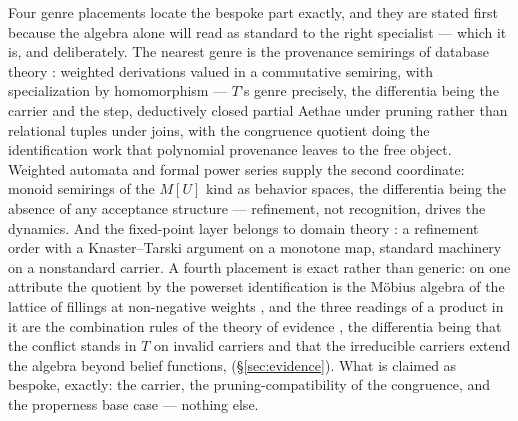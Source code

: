Four genre placements locate the bespoke part exactly, and they are stated first because the algebra alone will read as standard to the right specialist --- which it is, and deliberately. The nearest genre is the provenance semirings of database theory \cite{green2007provenance}: weighted derivations valued in a commutative semiring, with specialization by homomorphism --- $T$'s genre precisely, the differentia being the carrier and the step, deductively closed partial Aethae under pruning rather than relational tuples under joins, with the congruence quotient doing the identification work that polynomial provenance leaves to the free object. Weighted automata and formal power series \cite{droste2009handbook} supply the second coordinate: monoid semirings of the $M[U]$ kind as behavior spaces, the differentia being the absence of any acceptance structure --- refinement, not recognition, drives the dynamics. And the fixed-point layer belongs to domain theory \cite{abramskyjung1994domain}: a refinement order with a Knaster--Tarski argument on a monotone map, standard machinery on a nonstandard carrier. A fourth placement is exact rather than generic: on one attribute the quotient by the powerset identification is the M\"obius algebra of the lattice of fillings at non-negative weights \cite{solomon1967, greene1973}, and the three readings of a product in it are the combination rules of the theory of evidence \cite{dempster1967, shafer1976, smets1994}, the differentia being that the conflict stands in $T$ on invalid carriers and that the irreducible carriers extend the algebra beyond belief functions, (\S\ref{sec:evidence}). What is claimed as bespoke, exactly: the carrier, the pruning-compatibility of the congruence, and the properness base case --- nothing else.
